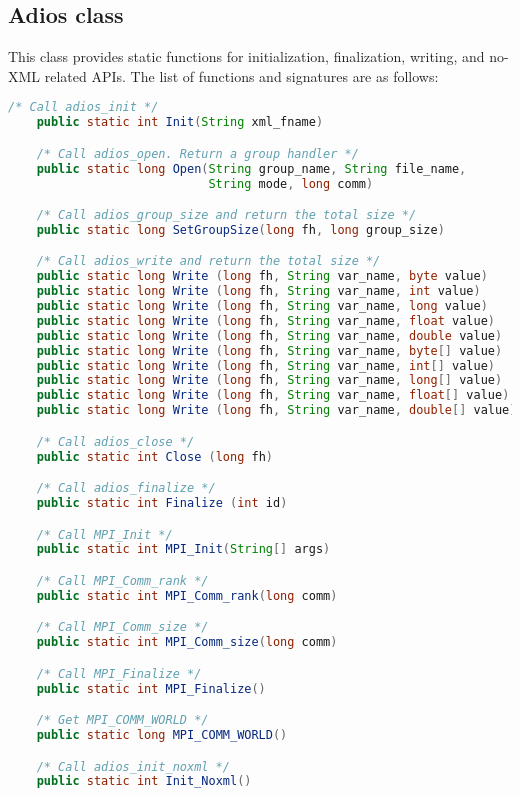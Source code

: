 \subsection{Adios class}
This class provides static functions for initialization, finalization, writing, and no-XML related APIs. The list of functions and signatures are as follows:
\begin{lstlisting}[language=Java,caption={Member functions in the Adios class},label={}]
    /* Call adios_init */
    public static int Init(String xml_fname)

    /* Call adios_open. Return a group handler */
    public static long Open(String group_name, String file_name, 
                            String mode, long comm)

    /* Call adios_group_size and return the total size */
    public static long SetGroupSize(long fh, long group_size)

    /* Call adios_write and return the total size */
    public static long Write (long fh, String var_name, byte value)
    public static long Write (long fh, String var_name, int value)
    public static long Write (long fh, String var_name, long value)
    public static long Write (long fh, String var_name, float value)
    public static long Write (long fh, String var_name, double value)
    public static long Write (long fh, String var_name, byte[] value)
    public static long Write (long fh, String var_name, int[] value)
    public static long Write (long fh, String var_name, long[] value)
    public static long Write (long fh, String var_name, float[] value)
    public static long Write (long fh, String var_name, double[] value)

    /* Call adios_close */
    public static int Close (long fh)

    /* Call adios_finalize */
    public static int Finalize (int id)

    /* Call MPI_Init */
    public static int MPI_Init(String[] args)

    /* Call MPI_Comm_rank */
    public static int MPI_Comm_rank(long comm)

    /* Call MPI_Comm_size */
    public static int MPI_Comm_size(long comm)

    /* Call MPI_Finalize */
    public static int MPI_Finalize()

    /* Get MPI_COMM_WORLD */
    public static long MPI_COMM_WORLD()

    /* Call adios_init_noxml */
    public static int Init_Noxml()


\end{lstlisting}
